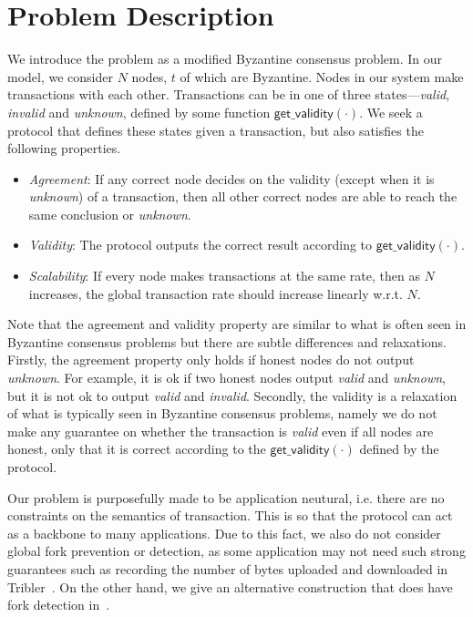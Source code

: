 \section{Problem Description}
\label{sec:description}
We introduce the problem as a modified Byzantine consensus problem.
In our model, we consider $N$ nodes, $t$ of which are Byzantine.
Nodes in our system make transactions with each other.
Transactions can be in one of three states---\emph{valid}, \emph{invalid} and \emph{unknown}, defined by some function $\textsf{get\_validity}(\cdot)$.
We seek a protocol that defines these states given a transaction,
but also satisfies the following properties.
\begin{itemize}
    \item \emph{Agreement}:
        If any correct node decides on the validity (except when it is \emph{unknown}) of a transaction,
        then all other correct nodes are able to reach the same conclusion or \emph{unknown}.
    \item \emph{Validity}:
        The protocol outputs the correct result according to $\textsf{get\_validity}(\cdot).$
    \item \emph{Scalability}:
        If every node makes transactions at the same rate,
        then as $N$ increases,
        the global transaction rate should increase linearly w.r.t. $N$.
\end{itemize}

Note that the agreement and validity property are similar to what is often seen in Byzantine consensus problems but there are subtle differences and relaxations.
Firstly, the agreement property only holds if honest nodes do not output \emph{unknown}.
For example, it is ok if two honest nodes output \emph{valid} and \emph{unknown}, but it is not ok to output \emph{valid} and \emph{invalid}.
Secondly, the validity is a relaxation of what is typically seen in Byzantine consensus problems,
namely we do not make any guarantee on whether the transaction is \emph{valid} even if all nodes are honest,
only that it is correct according to the $\textsf{get\_validity}(\cdot)$ defined by the protocol.

Our problem is purposefully made to be application neutural,
i.e. there are no constraints on the semantics of transaction.
This is so that the protocol can act as a backbone to many applications.
Due to this fact, we also do not consider global fork prevention or detection,
as some application may not need such strong guarantees such as recording the number of bytes uploaded and downloaded in Tribler~\cite{pimotte, pouwelse2008tribler}.
On the other hand, we give an alternative construction that does have fork detection in~.

